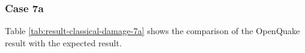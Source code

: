 \subsubsection{Case 7a}




Table \ref{tab:result-classical-damage-7a} shows the comparison of the OpenQuake result with the expected result.